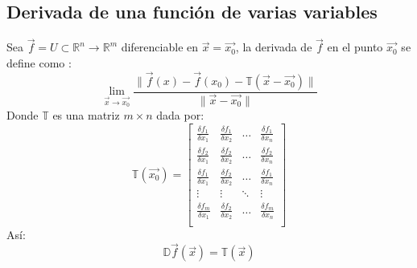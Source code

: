 \documentclass[a4paper]{article}
\newcommand{\abs}[1]{\lVert #1 \rVert}
\begin{document}
\subsection{Derivada de una función de varias variables}
Sea $\vec{f}=U\subset\mathbb{R}^n\longrightarrow\mathbb{R}^m$ diferenciable en $\vec{x}=\vec{x_0}$, la derivada de $\vec{f}$ en el punto $\vec{x_0}$ se define como :
\[\lim_{\vec{x}\rightarrow\vec{x_0}}\frac{\abs{\vec{f}(x)-\vec{f}(x_0)-\mathbb{T}(\vec{x}-\vec{x_0})}}{\abs{\vec{x}-\vec{x_0}}}\]
Donde $\mathbb{T}$ es una matriz $m\times n$ dada por:
\[\mathbb{T}(\vec{x_0})=
\begin{bmatrix}
\frac{\delta f_1}{\delta x_1}&\frac{\delta f_1}{\delta x_2}&\ldots&\frac{\delta f_1}{\delta x_n}\\
\frac{\delta f_2}{\delta x_1}&\frac{\delta f_2}{\delta x_2}&\ldots&\frac{\delta f_2}{\delta x_n}\\
\frac{\delta f_1}{\delta x_1}&\frac{\delta f_2}{\delta x_2}&\ldots&\frac{\delta f_1}{\delta x_n}\\
\vdots&\vdots&\ddots&\vdots\\
\frac{\delta f_m}{\delta x_1}&\frac{\delta f_2}{\delta x_2}&\ldots&\frac{\delta f_m}{\delta x_n}\\
\end{bmatrix}
\]
Así:
\[\mathbb{D}\vec{f}(\vec{x})=\mathbb{T}(\vec{x})\]
\end{document}
